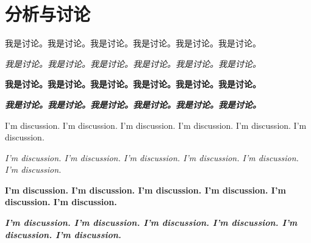 \chapter{分析与讨论}

我是讨论。我是讨论。我是讨论。我是讨论。我是讨论。我是讨论。

\textit{我是讨论。我是讨论。我是讨论。我是讨论。我是讨论。我是讨论。}

\textbf{我是讨论。我是讨论。我是讨论。我是讨论。我是讨论。我是讨论。}

\textbf{\textit{我是讨论。我是讨论。我是讨论。我是讨论。我是讨论。我是讨论。}}

I'm discussion. I'm discussion. I'm discussion. I'm discussion. I'm discussion. I'm discussion. 

\textit{I'm discussion. I'm discussion. I'm discussion. I'm discussion. I'm discussion. I'm discussion. }

\textbf{I'm discussion. I'm discussion. I'm discussion. I'm discussion. I'm discussion. I'm discussion. }

\textbf{\textit{I'm discussion. I'm discussion. I'm discussion. I'm discussion. I'm discussion. I'm discussion. }}

\clearpage